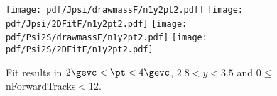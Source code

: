 \begin{figure}[H]
\begin{center}
\texttt{[image: pdf/Jpsi/drawmassF/n1y2pt2.pdf]}
\texttt{[image: pdf/Jpsi/2DFitF/n1y2pt2.pdf]}
\vspace*{-0.5cm}
\texttt{[image: pdf/Psi2S/drawmassF/n1y2pt2.pdf]}
\texttt{[image: pdf/Psi2S/2DFitF/n1y2pt2.pdf]}
\vspace*{-0.5cm}
\end{center}
\caption{Fit results in $2\gevc<\pt<4\gevc$, $2.8<y<3.5$ and 0$\leq$nForwardTracks$<$12.}
\label{Fitn1y2pt2}
\end{figure}
